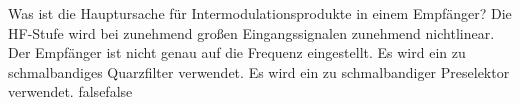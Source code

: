     {Was ist die Hauptursache für Intermodulationsprodukte in einem Empfänger?}
    {Die HF-Stufe wird bei zunehmend großen Eingangssignalen zunehmend nichtlinear.}
    {Der Empfänger ist nicht genau auf die Frequenz eingestellt.}
    {Es wird ein zu schmalbandiges Quarzfilter verwendet.}
    {Es wird ein zu schmalbandiger Preselektor verwendet.}
    {false}{false}